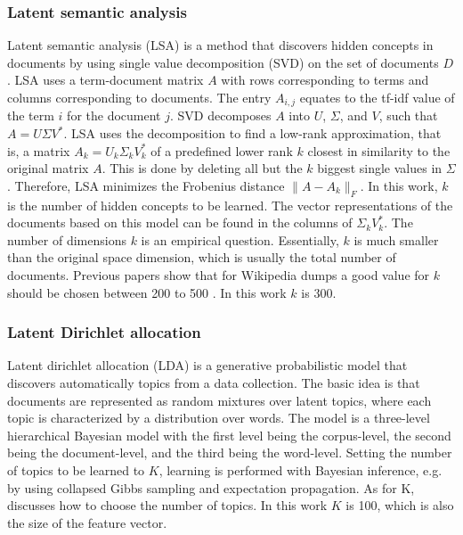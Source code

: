 \documentclass[a4paper]{article}
\begin{document}
\subsubsection{Latent semantic analysis}
Latent semantic analysis (LSA) \cite{deerwester1990indexing} is a method that discovers hidden concepts in documents by using single value decomposition (SVD) on the set of documents $D$.
LSA uses a term-document matrix $A$ with rows corresponding to terms and columns corresponding to documents. The entry $A_{i,j}$ equates to the tf-idf value of the term $i$ for the document $j$. SVD decomposes $A$ into $U$, $\Sigma$, and $V$, such that $A = U \Sigma V^*$.
LSA uses the decomposition to find a low-rank approximation, that is, a matrix $A_k = U_k \Sigma_k V_k^*$ of a predefined lower rank $k$ closest in similarity to the original matrix $A$. This is done by deleting all but the $k$ biggest single values in $\Sigma$.
Therefore, LSA minimizes the Frobenius distance $\|A-A_k\|_F$. In this work, $k$ is the number of hidden concepts to be learned. The vector representations of the documents based on this model can be found in the columns of $\Sigma_k V_k^*$.
The number of dimensions $k$ is an empirical question. Essentially, $k$ is much smaller than the original space dimension, which is usually the total number of documents. Previous papers show that for Wikipedia dumps a good value for $k$ should be chosen between 200 to 500 \cite{bradford2008empirical}. In this work $k$ is 300.


\subsubsection{Latent Dirichlet allocation}
Latent dirichlet allocation (LDA) \cite{blei2003latent} is a generative probabilistic model that discovers automatically topics from a data collection.
The basic idea is that documents are represented as random mixtures over latent topics, where each topic is characterized by a distribution over words. The model is a three-level hierarchical Bayesian model with the first level being the corpus-level, the second being the document-level, and the third being the word-level. Setting the number of topics to be learned to $K$, learning is performed with Bayesian inference, e.g. by using collapsed Gibbs sampling and expectation propagation. As for K, \cite{hoffman2010online} discusses how to choose the number of topics. In this work $K$ is 100, which is also the size of the feature vector.
\end{document}
